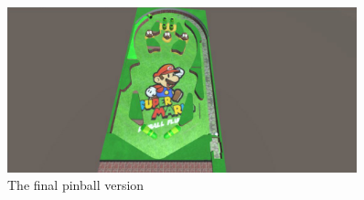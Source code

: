 \documentclass[11.5pt,oneside,a4paper]{scrartcl}
\begin{document}
\begin{figure}
	\centering
	\includegraphics[width=0.90\textwidth]{final.jpg}
	\caption{The final pinball version}
	\label{fig:final}
	\vspace{0.1cm}
\end{figure}
\end{document}
